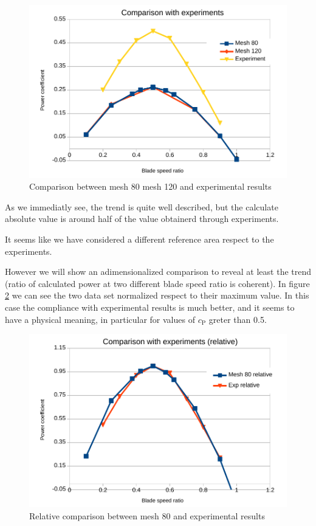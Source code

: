 \documentclass[a4paper,12pt]{article}
\begin{document}
\begin{figure}[H]
\centering
\includegraphics[width=14cm]{images/bsr/bsr-exp.pdf}
\caption{Comparison between mesh 80 mesh 120 and experimental results}
\label{fig:bsr-comparison-exp}
\end{figure}

As we immediatly see, the trend is quite well described, but the calculate absolute value is around half of the value obtainerd through experiments.

It seems like we have considered a different reference area respect to the experiments.

However we will show an adimensionalized comparison to reveal at least the trend (ratio of calculated power at two different blade speed ratio is coherent).
In figure \ref{fig:bsr-comparison-exp-relative} we can see the two data set normalized respect to their maximum value.
In this case the compliance with experimental results is much better, and it seems to have a physical meaning, in particular for values of $c_\text{P}$ greter than 0.5.

\begin{figure}[H]
\centering
\includegraphics[width=14cm]{images/bsr/bsr-exp-relative.pdf}
\caption{Relative comparison between mesh 80 and experimental results}
\label{fig:bsr-comparison-exp-relative}
\end{figure}
\end{document}
